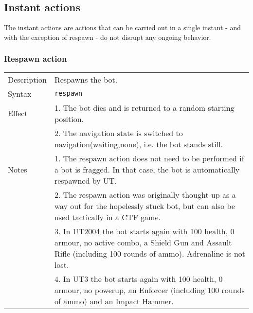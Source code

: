 \documentclass[11pt,a4paper]{article}
\begin{document}
%
\subsection{Instant actions}
%
The instant actions are actions that can be carried out in a single instant - and with the exception of respawn - do not disrupt any ongoing behavior.

%
\subsubsection*{Respawn action}
%
\begin{small}
\begin{tabular}{p{2cm}p{9cm}}
Description & Respawns the bot.\\ 
Syntax & \verb|respawn|\\
Effect &	1.	The bot dies and is returned to a random starting position.\\ 
&	2.	The navigation state is switched to navigation(waiting,none), i.e. the bot stands still.\\
Notes
&	1.	The respawn action does not need to be performed if a bot is fragged. In that case, the bot is automatically respawned by UT.\\
&	2.	The respawn action was originally thought up as a way out for the hopelessly stuck bot, but can also be used tactically in a CTF game.\\
&	3.	In UT2004 the bot starts again with 100 health, 0 armour, no active combo, a Shield Gun and Assault Rifle (including 100 rounds of ammo). Adrenaline is not lost.\\
&	4.	In UT3 the bot starts again with 100 health, 0 armour, no powerup, an Enforcer (including 100 rounds of ammo) and an Impact Hammer.\\
\end{tabular}
\end{small}

%
\end{document}
